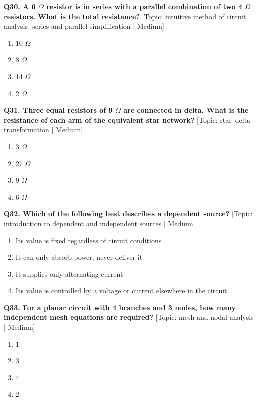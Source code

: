 \noindent\textbf{Q30. A 6 $\Omega$ resistor is in series with a parallel combination of two 4 $\Omega$ resistors. What is the total resistance?} \hfill [Topic: intuitive method of circuit analysis- series and parallel simplification | Medium]
\begin{enumerate}[label=(\alph*),topsep=2pt,itemsep=1pt,partopsep=0pt,parsep=0pt]
    \item {10 $\Omega$}
    \item {8 $\Omega$}
    \item {14 $\Omega$}
    \item {2 $\Omega$}
\end{enumerate}
\vspace{2mm}

\noindent\textbf{Q31. Three equal resistors of 9 $\Omega$ are connected in delta. What is the resistance of each arm of the equivalent star network?} \hfill [Topic: star--delta transformation | Medium]
\begin{enumerate}[label=(\alph*),topsep=2pt,itemsep=1pt,partopsep=0pt,parsep=0pt]
    \item {3 $\Omega$}
    \item {27 $\Omega$}
    \item {9 $\Omega$}
    \item {6 $\Omega$}
\end{enumerate}
\vspace{2mm}

\noindent\textbf{Q32. Which of the following best describes a dependent source?} \hfill [Topic: introduction to dependent and independent sources | Medium]
\begin{enumerate}[label=(\alph*),topsep=2pt,itemsep=1pt,partopsep=0pt,parsep=0pt]
    \item {Its value is fixed regardless of circuit conditions}
    \item {It can only absorb power, never deliver it}
    \item {It supplies only alternating current}
    \item {Its value is controlled by a voltage or current elsewhere in the circuit}
\end{enumerate}
\vspace{2mm}

\noindent\textbf{Q33. For a planar circuit with 4 branches and 3 nodes, how many independent mesh equations are required?} \hfill [Topic: mesh and nodal analysis | Medium]
\begin{enumerate}[label=(\alph*),topsep=2pt,itemsep=1pt,partopsep=0pt,parsep=0pt]
    \item {1}
    \item {3}
    \item {4}
    \item {2}
\end{enumerate}
\vspace{2mm}

